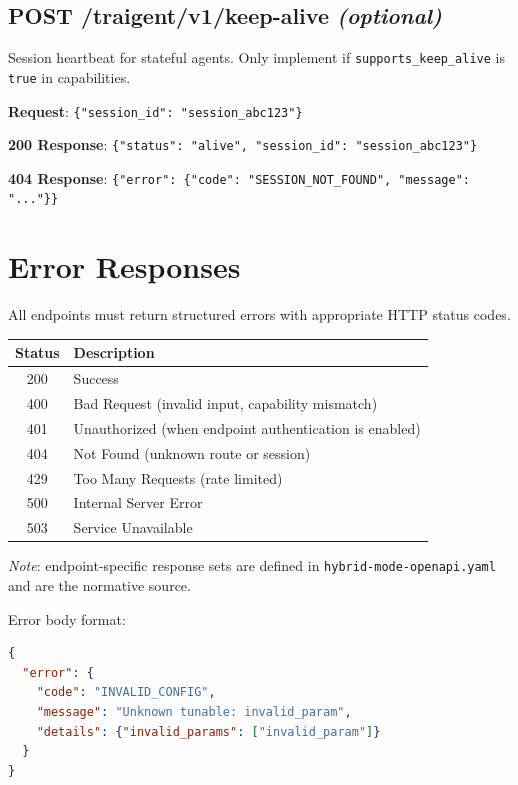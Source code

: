 \documentclass[11pt,a4paper]{article}
\newcommand{\field}[1]{\texttt{#1}}
\begin{document}
\subsection{POST /traigent/v1/keep-alive \normalfont\textit{(optional)}}

Session heartbeat for stateful agents.
Only implement if \field{supports\_keep\_alive} is \texttt{true} in capabilities.

\textbf{Request}: \texttt{\{"session\_id": "session\_abc123"\}}

\textbf{200 Response}: \texttt{\{"status": "alive", "session\_id": "session\_abc123"\}}

\textbf{404 Response}: \texttt{\{"error": \{"code": "SESSION\_NOT\_FOUND", "message": "..."\}\}}

\section{Error Responses}

All endpoints must return structured errors with appropriate HTTP status codes.

\begin{center}\small
\begin{tabular}{@{}cl@{}}
\toprule
\textbf{Status} & \textbf{Description} \\
\midrule
200 & Success \\
400 & Bad Request (invalid input, capability mismatch) \\
401 & Unauthorized (when endpoint authentication is enabled) \\
404 & Not Found (unknown route or session) \\
429 & Too Many Requests (rate limited) \\
500 & Internal Server Error \\
503 & Service Unavailable \\
\bottomrule
\end{tabular}
\end{center}

\textit{Note}: endpoint-specific response sets are defined in
\texttt{hybrid-mode-openapi.yaml} and are the normative source.

Error body format:

\begin{lstlisting}[language=json]
{
  "error": {
    "code": "INVALID_CONFIG",
    "message": "Unknown tunable: invalid_param",
    "details": {"invalid_params": ["invalid_param"]}
  }
}
\end{lstlisting}
\end{document}
